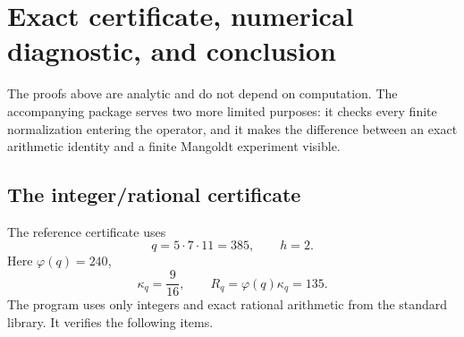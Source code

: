 \section{Exact certificate, numerical diagnostic, and conclusion}
\label{sec:certificate-conclusion}

The proofs above are analytic and do not depend on computation.  The
accompanying package serves two more limited purposes: it checks every finite
normalization entering the operator, and it makes the difference between an
exact arithmetic identity and a finite Mangoldt experiment visible.

\subsection{The integer/rational certificate}

The reference certificate uses
\begin{equation}\label{eq:certificate-parameters}
 q=5\cdot7\cdot11=385,
 \qquad h=2.
\end{equation}
Here $\varphi(q)=240$,
\begin{equation}\label{eq:certificate-kappa}
 \kappa_q=\frac9{16},
 \qquad
 R_q=\varphi(q)\kappa_q=135.
\end{equation}
The program
uses only integers and exact rational arithmetic from the standard library.
It verifies the following items.

